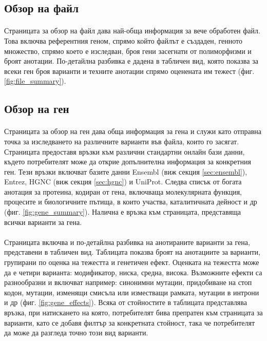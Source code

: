 \documentclass[pdftex,cyrillic,14pt,a4page,twoside,openright]{extreport}
\begin{document}
\subsection{Обзор на файл}
\paragraph{}
Страницата за обзор на файл дава най-обща информация за вече обработен файл. Това включва референтния геном, спрямо който файлът е създаден, генното множество, спрямо което е изследван, броя гени засегнати от полиморфизми и броят анотации. По-детайлна разбивка е дадена в табличен вид, която показва за всеки ген броя варианти и техните анотации спрямо оценената им тежест (фиг. \ref{fig:file_summary}).


\subsection{Обзор на ген}
\paragraph{}
Страницата за обзор на ген дава обща информация за гена и служи като отправна точка за изследването на различните варианти във файла, които го засягат. Страницата предоставя връзки към различни стандартни онлайн бази данни, където потребителят може да открие допълнителна информация за конкретния ген. Тези връзки включват базите данни Ensembl (виж секция \ref{sec:ensembl}), Entrez, HGNC (виж секция \ref{sec:hgnc}) и UniProt. Следва списък от богата анотация за протеина, кодиран от гена, включваща молекулярната функция, процесите и биологичните пътища, в които участва, каталитичната дейност и др (фиг. \ref{fig:gene_summary}). Налична е връзка към страницата, представяща всички варианти за гена.

\paragraph{}
Страницата включва и по-детайлна разбивка на анотираните варианти за гена, представени в табличен вид. Таблицата показва броят на анотациите за варианти, групирани по оценка на тежестта и генетичен ефект. Оценката на тежестта може да е четири варианта: модификатор, ниска, средна, висока. Възможните ефекти са разнообразни и включват например: синонимни мутации, придобиване на стоп кодон, мутации, изменящи смисъла или изместващи рамката, мутации в интрони и др (фиг. \ref{fig:gene_effects}). Всяка от стойностите в таблицата представлява връзка, при натискането на която, потребителят бива препратен към страницата за варианти, като се добавя филтър за конкретната стойност, така че потребителят да може да разгледа точно този вид варианти.
\end{document}

